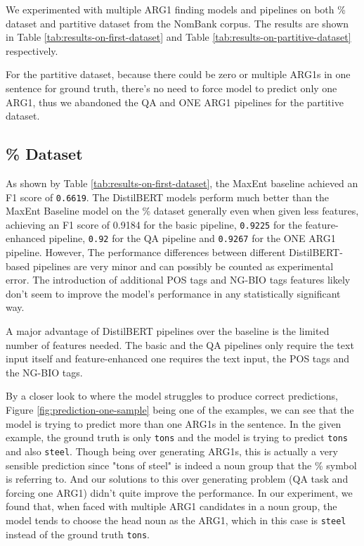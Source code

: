 \documentclass[11pt]{article}
\begin{document}
We experimented with multiple ARG1 finding models and pipelines on both \% dataset and partitive dataset from the NomBank corpus. The results are shown in Table \ref{tab:results-on-first-dataset} and Table \ref{tab:results-on-partitive-dataset} respectively.

For the partitive dataset, because there could be zero or multiple ARG1s in one sentence for ground truth, there's no need to force model to predict only one ARG1, thus we abandoned the QA and ONE ARG1 pipelines for the partitive dataset.

\subsection{\% Dataset}
\label{sec:results-first-dataset}

As shown by Table \ref{tab:results-on-first-dataset}, the MaxEnt baseline achieved an F1 score of \verb|0.6619|. The DistilBERT models perform much better than the MaxEnt Baseline model on the \% dataset generally even when given less features, achieving an F1 score of 0.9184 for the basic pipeline,  \verb|0.9225| for the feature-enhanced pipeline,  \verb|0.92| for the QA pipeline and  \verb|0.9267| for the ONE ARG1 pipeline. However, The performance differences between different DistilBERT-based pipelines are very minor and can possibly be counted as experimental error. The introduction of additional POS tags and NG-BIO tags features likely don't seem to improve the model's performance in any statistically significant way.

A major advantage of DistilBERT pipelines over the baseline is the limited number of features needed. The basic and the QA pipelines only require the text input itself and feature-enhanced one requires the text input, the POS tags and the NG-BIO tags.

By a closer look to where the model struggles to produce correct predictions, Figure \ref{fig:prediction-one-sample} being one of the examples, we can see that the model is trying to predict more than one ARG1s in the sentence. In the given example, the ground truth is only \verb|tons| and the model is trying to predict \verb|tons| and also \verb|steel|. Though being over generating ARG1s, this is actually a very sensible prediction since "tons of steel" is indeed a noun group that the \% symbol is referring to. And our solutions to this over generating problem (QA task and forcing one ARG1) didn't quite improve the performance. In our experiment, we found that, when faced with multiple ARG1 candidates in a noun group, the model tends to choose the head noun as the ARG1, which in this case is \verb|steel| instead of the ground truth \verb|tons|.
\end{document}
